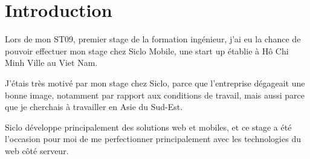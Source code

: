 \documentclass[rapport.tex]{subfiles}
\begin{document}
    \section*{Introduction}
    Lors de mon ST09, premier stage de la formation ingénieur,
    j'ai eu la chance de pouvoir effectuer mon stage chez Siclo Mobile,
    une start up établie à Hô Chi Minh Ville au Viet Nam.

    J'étais très motivé par mon stage chez Siclo, parce que l'entreprise dégageait une bonne image, notamment par rapport aux conditions de travail, mais aussi parce que je cherchais à travailler en Asie du Sud-Est.

    Siclo développe principalement des solutions web et mobiles, et ce stage a été l'occasion pour moi de me perfectionner principalement avec les technologies du web côté serveur.
\end{document}

